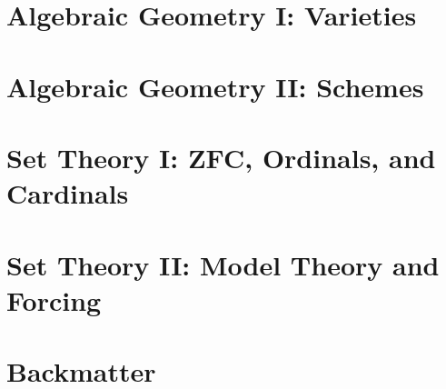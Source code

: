 \documentclass[11pt,numbers=noenddot]{scrreprt}
\begin{document}
\part{Algebraic Geometry I: Varieties}





\part{Algebraic Geometry II: Schemes}

\part{Set Theory I: ZFC, Ordinals, and Cardinals}





\part{Set Theory II: Model Theory and Forcing}




\part{Backmatter}
\appendix






\clearpage
\printbibliography
\end{document}

